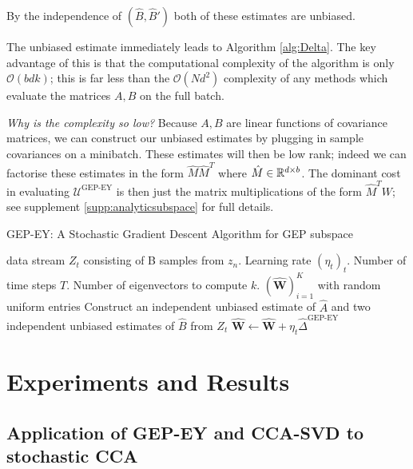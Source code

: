 By the independence of $(\hat{B},\hat{B}')$ both of these estimates are unbiased.

The unbiased estimate immediately leads to Algorithm \ref{alg:Delta}.
The key advantage of this is that the computational complexity of the algorithm is only $\mathcal{O}(b d k)$; this is far less than the $\mathcal{O}(N d^2)$ complexity of any methods which evaluate the matrices $A,B$ on the full batch.

\textit{Why is the complexity so low?} Because $A,B$ are linear functions of covariance matrices, we can construct our unbiased estimates by plugging in sample covariances on a minibatch.
These estimates will then be low rank; indeed we can factorise these estimates in the form $\hat{M} \hat{M}^T$ where $\hat{M} \in \mathbb{R}^{d \times b}$. The dominant cost in evaluating $\mathcal{U}^\text{GEP-EY}$ is then just the matrix multiplications of the form $\hat{M}^T W$; see supplement \ref{supp:analyticsubspace} for full details.

\begin{algorithm}
    \caption{GEP-EY: A Stochastic Gradient Descent Algorithm for GEP subspace}
    \label{alg:Delta}
    \begin{algorithmic}
         data stream $Z_t$ consisting of B samples from $z_n$. Learning rate $(\eta_t)_t$. Number of time steps $T$. Number of eigenvectors to compute $k$.
         $(\hat{\mathbf {W}})_{i=1}^K$ with random uniform entries
        \STATE Construct an independent unbiased estimate of $\hat{A}$ and two independent unbiased estimates of $\hat{B}$ from $Z_t$
        \STATE $\hat{\mathbf {W}} \leftarrow \hat{\mathbf {W}}+\eta_{t} \hat{\Delta}^{\text{GEP-EY}}$
        \ENDFOR
    \end{algorithmic}
\end{algorithm}

\section{Experiments and Results}

\subsection{Application of GEP-EY and CCA-SVD to stochastic CCA}


